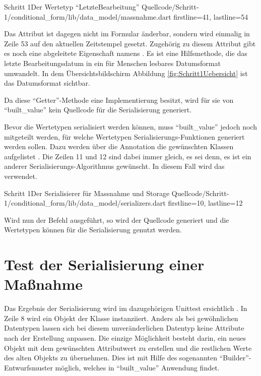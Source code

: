 \begin{alexlisting}{Schritt 1}{Der Wertetyp \enquote{LetzteBearbeitung}}
  {Quellcode/Schritt-1/conditional_form/lib/data_model/massnahme.dart}
  {firstline=41, lastline=54}
  \label{lst:Schritt1WerteTypLetzteBearbeitung}
\end{alexlisting}

Das Attribut  ist dagegen nicht im Formular änderbar, sondern wird einmalig in Zeile 53 auf den aktuellen Zeitstempel gesetzt.
Zugehörig zu diesem Attribut gibt es noch eine abgeleitete Eigenschaft namens  .
Es ist eine Hilfsmethode, die das letzte Bearbeitungsdatum in ein für Menschen lesbares Datumsformat umwandelt. In dem Übersichtsbildschirm Abbildung \ref{fig:Schritt1Uebersicht} ist das Datumsformat sichtbar.

Da diese \enquote{Getter}-Methode eine Implementierung besitzt, wird für sie von \enquote{built_value} kein Quellcode für die Serialisierung generiert.

Bevor die Wertetypen serialisiert werden können, muss \enquote{built_value} jedoch noch mitgeteilt werden, für welche Wertetypen Serialisierungs-Funktionen generiert werden sollen.
Dazu werden über die Annotation  die gewünschten Klassen aufgelistet .
Die Zeilen 11 und 12 sind dabei immer gleich, es sei denn, es ist ein anderer Serialisierungs-Algorithmus gewünscht.
In diesem Fall wird das verwendet.

\begin{alexlisting}{Schritt 1}{Der Serialisierer für Massnahme und Storage}
  {Quellcode/Schritt-1/conditional_form/lib/data_model/serializers.dart}
  {firstline=10, lastline=12}
  \label{lst:Schritt1Serialisierer}
\end{alexlisting}


Wird nun der Befehl   ausgeführt, so wird der Quellcode generiert und die Wertetypen können für die Serialisierung genutzt werden.

\section{Test der Serialisierung einer Maßnahme}

Das Ergebnis der Serialisierung wird im dazugehörigen Unittest ersichtlich \Lst{\ref{lst:SerialisierungEinerMassnahmeUnittest}}.
In Zeile 8 wird ein Objekt der Klasse  instanziiert.
Anders als bei gewöhnlichen Datentypen lassen sich bei diesem unveränderlichen Datentyp keine Attribute nach der Erstellung anpassen.
Die einzige Möglichkeit besteht darin, ein neues Objekt  mit dem gewünschten Attributwert zu erstellen und die restlichen Werte des alten Objekts zu übernehmen.
Dies ist mit Hilfe des sogenannten \enquote{Builder}-Entwurfsmuster möglich, welches in \enquote{built_value} Anwendung findet.

